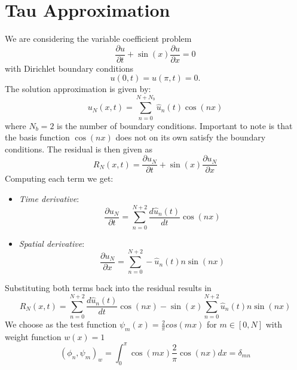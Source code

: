 \section{Tau Approximation}
We are considering the variable coefficient problem
\begin{equation}
	\frac{\partial u}{\partial t}+\sin (x) \frac{\partial u}{\partial x}=0
	\label{eq:pde3}
\end{equation}
with Dirichlet boundary conditions
\begin{equation}
	u(0,t) = u(\pi, t) = 0.
	\label{eq:bdc3}
\end{equation}
The solution approximation is given by:
\begin{equation}
	u_N(x,t) = \sum_{n=0}^{N+N_b} \hat{u}_n(t)\cos(nx)
	\label{eq:sol_approx}
\end{equation}
where $N_b = 2$ is the number of boundary conditions.\newline
Important to note is that the basis function $\cos(nx)$ does not on its own satisfy the boundary conditions.
The residual is then given as
\begin{equation}
	R_N(x, t) = \frac{\partial u_N}{\partial t}+\sin (x) \frac{\partial u_N}{\partial x}
\end{equation}
Computing each term we get:
\begin{itemize}
	\item \textit{Time derivative}:
	      \begin{equation}
		      \frac{\partial u_N}{\partial t} = \sum_{n=0}^{N+2} \frac{d\hat{u}_n(t)}{dt} \cos(nx)
		      \label{eq:tim_derv3}
	      \end{equation}
	\item \textit{Spatial derivative}:
	      \begin{equation}
		      \frac{\partial u_N}{\partial x} = \sum_{n=0}^{N+2} -\hat{u}_n(t) n \sin(nx)
		      \label{eq:spat_derv3}
	      \end{equation}
\end{itemize}
Substituting both terms back into the residual results in
\begin{equation}
	R_N(x, t) = \sum_{n=0}^{N+2} \frac{d\hat{u}_n(t)}{dt} \cos(nx) -  \sin(x) \sum_{n=0}^{N+2} \hat{u}_n(t) n \sin(nx)
	\label{eq:res3}
\end{equation}
We choose as the test function $\psi_m(x) = \frac{2}{\pi}cos(mx)$ for $m \in [0, N]$ with weight function $w(x) = 1$
\begin{equation}
	(\phi_n, \psi_m)_w = \int_0^{\pi} \cos(mx) \frac{2}{\pi}\cos(nx) dx = \delta_{mn}
	\label{eq:weight_f}
\end{equation}
